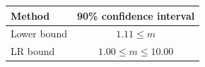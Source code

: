 
\begin{center}
\begin{tabular}{l|c}
\hline
Method & 90\% confidence interval \\
\hline
Lower bound & $1.11 \leq m$ \\
LR bound & $1.00 \leq m \leq 10.00$ \\
\hline
\end{tabular}
\end{center}

